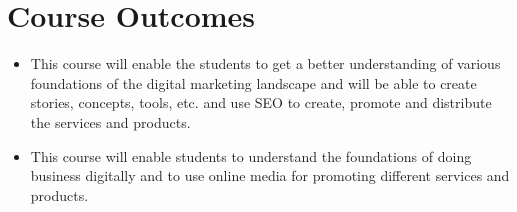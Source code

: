 
\section{Course Outcomes}

\begin{itemize}
\item This course will enable the students to get a better understanding of various foundations of the digital marketing landscape and will be able to create stories, concepts, tools, etc. and use SEO to create, promote and distribute the services and products.
\item This course will enable students to understand the foundations of doing business digitally and to use online media for promoting different services and products.
\end{itemize}
